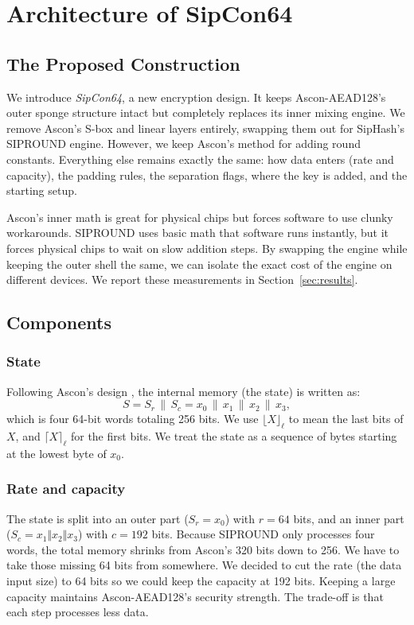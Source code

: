 \section{Architecture of SipCon64}
\label{sec:architecture}

\subsection{The Proposed Construction}

We introduce \emph{SipCon64}, a new encryption design. It keeps Ascon-AEAD128's outer sponge structure intact but completely replaces its inner mixing engine. We remove Ascon's S-box and linear layers entirely, swapping them out for SipHash's SIPROUND engine. However, we keep Ascon's method for adding round constants. Everything else remains exactly the same: how data enters (rate and capacity), the padding rules, the separation flags, where the key is added, and the starting setup.

Ascon's inner math is great for physical chips but forces software to use clunky workarounds. SIPROUND uses basic math that software runs instantly, but it forces physical chips to wait on slow addition steps. By swapping the engine while keeping the outer shell the same, we can isolate the exact cost of the engine on different devices. We report these measurements in Section~\ref{sec:results}.

\subsection{Components}

\subsubsection{State}
Following Ascon's design \cite{caesar}, the internal memory (the state) is written as:
\begin{equation}
S = S_r \,\|\, S_c = x_0 \,\|\, x_1 \,\|\, x_2 \,\|\, x_3,
\label{eq:state}
\end{equation}
which is four 64-bit words totaling 256 bits. We use $\lfloor X\rfloor_{\ell}$ to mean the last bits of $X$, and $\lceil X\rceil_{\ell}$ for the first bits. We treat the state as a sequence of bytes starting at the lowest byte of $x_0$.

\subsubsection{Rate and capacity}
The state is split into an outer part ($S_r = x_0$) with $r=64$ bits, and an inner part ($S_c = x_1\Vert{}x_2\Vert{}x_3$) with $c=192$ bits. Because SIPROUND only processes four words, the total memory shrinks from Ascon's 320 bits down to 256. We have to take those missing 64 bits from somewhere. We decided to cut the rate (the data input size) to 64 bits so we could keep the capacity at 192 bits. Keeping a large capacity maintains Ascon-AEAD128's security strength. The trade-off is that each step processes less data.

